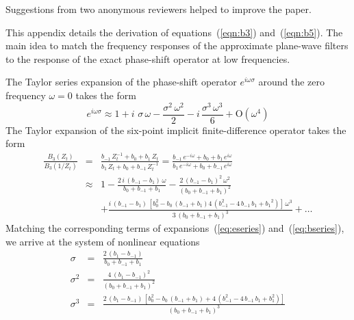 Suggestions from two anonymous reviewers helped to improve the paper.




\newpage


This appendix details the derivation of equations~(\ref{eqn:b3})
and~(\ref{eqn:b5}). The main idea to match the frequency responses 
of the approximate plane-wave filters to the response of the exact 
phase-shift operator at low frequencies.

The Taylor series expansion of the phase-shift operator $e^{i \omega
  \sigma}$ around the zero frequency $\omega=0$ takes the form
\begin{equation}
  e^{i \omega \sigma} \approx 1 + i\, \,\sigma\,\omega - 
  \frac{\sigma^2\,\omega^2}{2} - i\, \frac{\sigma^3\,\omega^3}{6} +
  \mbox{O}\left(\omega^4\right)
  \label{eq:eseries}
\end{equation}
The Taylor expansion of the six-point implicit finite-difference operator 
takes the form
\begin{eqnarray}
  \nonumber
\frac{B_3(Z_t)}{B_3(1/Z_t)} & = &
\frac
{b_{-1}\,Z_t^{-1} + b_0 + b_1\,Z_t}
{b_1\,Z_t + b_0 + b_{-1}\,Z_t^{-1}} = 
\frac
{b_{-1}\,e^{-i \omega} + b_0 + b_1\,e^{i \omega}}
{b_1\,e^{-i \omega} + b_0 + b_{-1}\,e^{i \omega}} \\
\nonumber
 & \approx &
1 - \frac{2\,i \,\left( b_{-1} - b_1 \right) \,\omega}{b_0 + b_{-1} + b_1} - 
  \frac{2\,\left( b_{-1} - b_1 \right)^2\,\omega^2}
  {\left( b_0 + b_{-1} + b_1 \right)^2} \\
& &  + 
  \frac{i\,
     \left( b_{-1} - b_1 \right) \,
     \left[ b_0^2 - b_0\,\left( b_{-1} + b_1 \right) 
       4\,\left( b_{-1}^2 - 4\,b_{-1}\,b_1 + 
          {b_1}^2 \right)  \right] \,\omega^3}
    {3\,\left(b_0 + b_{-1} + b_1\right)^3} + \ldots
\label{eq:bseries}
\end{eqnarray}
Matching the corresponding terms of expansions~(\ref{eq:eseries}) 
and~(\ref{eq:bseries}), we arrive at the system of nonlinear equations
\begin{eqnarray}
  \sigma & = & \frac{2\,\left( b_1 - b_{-1} \right) }
  {b_0 + b_{-1} +b_1} 
  \label{eq:sys1} \\
  \sigma^2 & = & \frac{4\,\left( b_1 - b_{-1} \right)^2}
  {\left(b_0 + b_{-1} +b_1 \right)^2} \label{eq:sys2}
  \\
  \sigma^3 & = & \frac{2\,\left( b_1 - b_{-1} \right) \,
    \left[ b_0^2 - b_0\,\left( b_{-1} +b_1 \right)  + 
         4\,\left( b_{-1}^2 - 4\,b_{-1}\,b_1 + 
            b_1^2 \right)  \right] }
      {\left(b_0 + b_{-1} + b_1 \right)^3}
      \label{eq:sys3}
\end{eqnarray}
